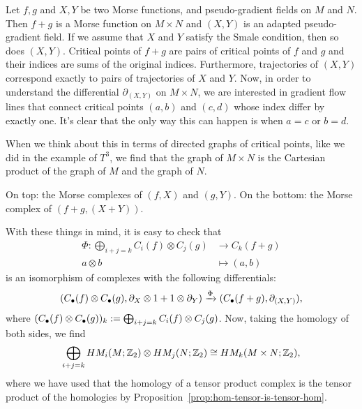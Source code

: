 \begin{myproof}
    Let $f, g$ and $X, Y$ be two Morse functions, and pseudo-gradient fields on  $M$ and  $N$.
    Then $f + g$ is a Morse function on $M \times N$ and $(X, Y)$ is an adapted pseudo-gradient field. If we assume that $X$ and  $Y$ satisfy the Smale condition, then so does $(X,Y)$.
    Critical points of $f+g$ are pairs of critical points of $f$ and $g$ and their indices are sums of the original indices.
    Furthermore, trajectories of $(X, Y)$ correspond exactly to pairs of trajectories of $X$ and $Y$.
    Now, in order to understand the differential $\partial_{(X, Y)}$ on $M \times N$, we are interested in gradient flow lines that connect critical points $(a,b)$ and  $(c,d)$ whose index differ by exactly one.
    It's clear that the only way this can happen is when $a = c$ or $b = d$.

    When we think about this in terms of directed graphs of critical points, like we did in the example of $T^{3}$, we find that the graph of $M \times N$ is the Cartesian product of the graph of $M$ and the graph of  $N$.
    \begin{marginfigure}
        \centering
        \caption{On top: the Morse complexes of $(f, X)$ and $(g, Y)$. On the bottom: the Morse complex of $(f+g, (X+Y))$.}
        \label{fig:kunneth-formula}
    \end{marginfigure}
    With these things in mind, it is easy to check that
    \begin{align*}
        \Phi: \bigoplus_{i+j = k} C_i(f) \otimes C_j(g) &\longrightarrow C_k(f+g) \\
        a \otimes b &\longmapsto (a,b)
    \end{align*}
    is an isomorphism of complexes with the following differentials:
    \[
        (C_\bul(f) \otimes C_\bul(g), \partial_X \otimes 1 + 1 \otimes \partial_Y) \xrightarrow{\Phi}   (C_\bul(f+g), \partial_{(X,Y)})
    ,\]
    where $(C_\bul(f) \otimes C_\bul(g))_k := \bigoplus_{i+j = k} C_i(f) \otimes C_j(g)$.
    Now, taking the homology of both sides, we find
    \[
        \bigoplus_{i+j = k} \HMf[i]{M; \Z_2} \otimes \HMf[j]{N; \Z_2} \cong \HMf[k]{M \times N; \Z_2}
    ,\]
    where we have used that the homology of a tensor product complex is the tensor product of the homologies by Proposition~\ref{prop:hom-tensor-is-tensor-hom}.
\end{myproof}


